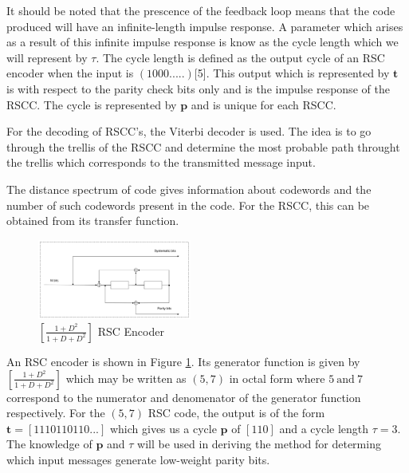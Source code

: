 \documentclass[conference]{IEEEtran}
\begin{document}
It should be noted that the prescence of the feedback loop means that the code produced will have an infinite-length impulse response. A parameter which arises as a result of this infinite impulse response is know as the cycle length which we will represent by $\tau$. The cycle length is defined as the output cycle of an RSC encoder when the input is $(1 0 0 0 .....)$[5]. This output which is represented by $\textbf{t} $ is with respect to the parity check bits only and is the impulse response of the RSCC. The cycle is represented by $\textbf{p}$ and is unique for each RSCC. 


For the decoding of RSCC's, the Viterbi decoder is used. The idea is to go through the trellis of the RSCC and determine the most probable path throught the trellis which corresponds to the transmitted message input.

The distance spectrum of code gives information about codewords and the number of such codewords present in the code. For the RSCC, this can be obtained from its transfer function.  

\begin{figure}[h]
\centering
		\includegraphics[width=0.45\textwidth]{RSCExample3.pdf}
		\caption{$[\frac{1+D^2}{1+D+D^2}]$  RSC Encoder}
		\label{fig1}
		\end{figure}
		
An RSC encoder is shown in Figure \ref{fig1}. Its generator function is given by $[\frac{1+D^2}{1+D+D^2}]$ which may be written as $(5,7)$ in octal form where $5 ~ \text{and} ~ 7$ correspond to the numerator and denomenator of the generator function respectively. 
 For the $(5,7)$ RSC code, the output is of the form $\textbf{t}=[1 1 1 0 1 1 0 1 1 0 ...]$ which gives us a cycle $\textbf{p}$ of $[1 1 0]$ and a cycle length $\tau =3$.
The knowledge of $\textbf{p}$ and $\tau$ will be used in deriving the method for determing which input messages generate low-weight parity bits. 
\end{document}
